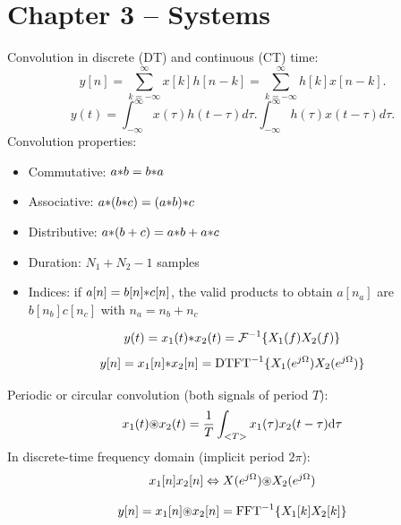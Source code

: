 \section*{Chapter 3 -- Systems}

Convolution in discrete (DT) and continuous (CT) time:
\begin{equation}
y[n] = \sum_{k=-\infty}^{\infty} x[k] h[n-k]  = \sum_{k=-\infty}^{\infty} h[k] x[n-k].
\end{equation}
\begin{equation}
y(t) =  \int_{-\infty}^{\infty} x(\tau) h(t-\tau) d\tau. \int_{-\infty}^{\infty} h(\tau) x(t-\tau) d\tau.
\label{eq:convolution_in_continuoustime}
\end{equation}
Convolution properties:
\begin{itemize}
	\item Commutative: $a {\ast} b = b {\ast} a$
	\item Associative: $a {\ast} (b {\ast} c) = (a {\ast} b) {\ast} c$
	\item Distributive: $a {\ast} (b + c) = a {\ast} b + a {\ast} c$
	\item Duration: $N_1+N_2-1$ samples
	\item Indices: if $a[n]=b[n]{\ast} c[n]$, the valid products to obtain $a[n_a]$ are $b[n_b]c[n_c]$ with $n_a=n_b+n_c$
\end{itemize}

\begin{equation}
y(t) = x_1(t) {\ast} x_2(t) = {\cal F}^{-1} \{ X_1(f) X_2(f) \}
\label{eq:convolutionInFreqDomain}
\end{equation}
\begin{equation}
y[n] = x_1[n] {\ast} x_2[n] = \textrm{DTFT}^{-1} \{ X_1(e^{j {\Omega}}) X_2(e^{j {\Omega}}) \}
\label{eq:convolutionInFreqDomainDiscreteTime}
\end{equation}

Periodic or circular convolution (both signals of period $T$):
\begin{equation}
x_1(t) {\circledast} x_2(t) = \frac{1}{T} \int_{<T>} x_1(\tau)  x_2(t-\tau) \textrm{d}\tau
\label{eq:circularConvolution}
\end{equation}
In discrete-time frequency domain (implicit period $2 \pi$):
\begin{equation}
x_1[n]  x_2[n] \Leftrightarrow X(e^{j {\Omega}}) {\circledast} X_2(e^{j {\Omega}})
\label{eq:windowingConvolution2}
\end{equation}

\begin{equation}
y[n] = x_1[n] {\circledast} x_2[n] = \textrm{FFT}^{-1} \{ X_1[k] X_2[k] \}
\label{eq:circularConvolutionWithFFT}
\end{equation}

